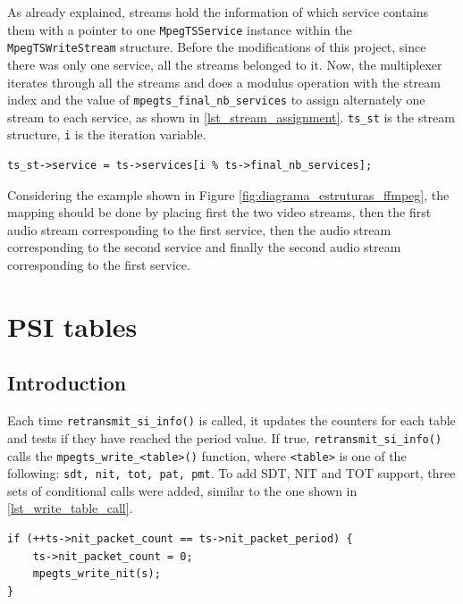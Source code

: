 \documentclass[
	12pt,				%
	openright,			%
	twoside,			%
	a4paper,			%
	brazil,
	french,				%
	english
	]{abntex2}
\begin{document}
As already explained, streams hold the information of which service contains them with a pointer to one \texttt{MpegTSService} instance within the \texttt{MpegTSWriteStream} structure. Before the modifications of this project, since there was only one service, all the streams belonged to it. Now, the multiplexer iterates through all the streams and does a modulus operation with the stream index and the value of \texttt{mpegts\_final\_nb\_services} to assign alternately one stream to each service, as shown in \autoref{lst_stream_assignment}. \texttt{ts\_st} is the stream structure, \texttt{i} is the iteration variable.

\begin{lstlisting}[caption={Assigning streams to services.}, label={lst_stream_assignment}]
ts_st->service = ts->services[i % ts->final_nb_services];
\end{lstlisting}

Considering the example shown in Figure \ref{fig:diagrama_estruturas_ffmpeg}, the mapping should be done by placing first the two video streams, then the first audio stream corresponding to the first service, then the audio stream corresponding to the second service and finally the second audio stream corresponding to the first service.

\section{PSI tables}

\subsection{Introduction}
Each time \texttt{retransmit\_si\_info()} is called, it updates the counters for each table and tests if they have reached the period value. If true, \texttt{retransmit\_si\_info()} calls the \texttt{mpegts\_write\_<table>()} function, where \texttt{<table>} is one of the following: \texttt{sdt, nit, tot, pat, pmt}. To add SDT, NIT and TOT support, three sets of conditional calls were added, similar to the one shown in \autoref{lst_write_table_call}.

\begin{lstlisting}[caption={Conditional call to \texttt{mpegts\_write\_nit()}.}, label={lst_write_table_call}]
if (++ts->nit_packet_count == ts->nit_packet_period) {
    ts->nit_packet_count = 0;
    mpegts_write_nit(s);
}
\end{lstlisting}
\end{document}
